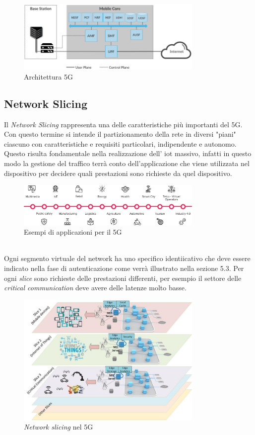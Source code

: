\begin{figure}[ht]
    \centering
    \includegraphics[width=0.8\textwidth]{images/5g-planes.png}
    \caption{Architettura 5G\cite{5g-approach}}
\end{figure}

\clearpage

\subsection{Network Slicing}
Il \textit{Network Slicing} rappresenta una delle caratteristiche più importanti del 5G. Con questo termine si intende il partizionamento della
rete in diversi "piani" ciascuno con caratteristiche e requisiti particolari, indipendente e autonomo. Questo risulta fondamentale nella realizzazione 
dell' \gls{iot} massivo, infatti in questo modo la gestione del traffico terrà conto dell'applicazione che viene utilizzata nel dispositivo per decidere quali prestazioni sono 
richieste da quel dispositivo.
\begin{figure}[ht]
    \centering
    \includegraphics[width=0.8\textwidth]{images/5g-eg-of-use.png}
    \caption{Esempi di applicazioni per il 5G}
\end{figure}\\
Ogni segmento virtuale del network ha uno specifico identiicativo che deve essere indicato nella fase di autenticazione come verrà illustrato nella sezione 5.3. Per ogni \textit{slice} sono 
richieste delle prestazioni differenti, per esempio il settore delle \textit{critical communication} deve avere delle latenze molto basse.
\begin{figure}[ht]
    \centering
    \includegraphics[width=0.8\textwidth]{images/5g-slicing.jpg}
    \caption{\textit{Network slicing} nel 5G}
\end{figure}\\
